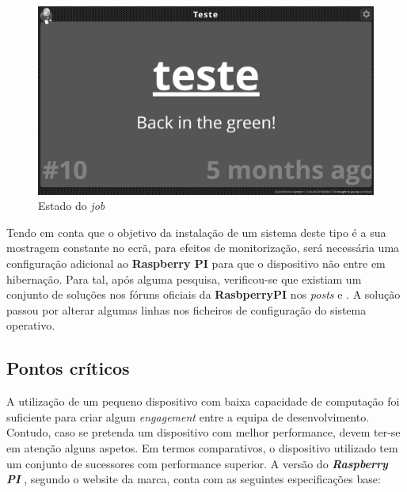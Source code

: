 \begin{figure}
\centering
\includegraphics[width=0.9\linewidth]{Cap8/BuildMonitorView.png}
\caption{Estado do \textit{job}}
\label{Fig:Fig6}
\end{figure}

\hspace{1cm}Tendo em conta que o objetivo da instalação de um sistema deste tipo é a sua mostragem constante no ecrã, para efeitos de monitorização, será necessária uma configuração adicional ao \textbf{Raspberry PI} para que o dispositivo não entre em hibernação. Para tal, após alguma pesquisa, verificou-se que existiam um conjunto de soluções nos fóruns oficiais da \textbf{RasbperryPI} nos \textit{posts} \textit{\cite{rasbperryPIFix}} e \textit{\cite{rasbperryPIFix2}}. A solução passou por alterar algumas linhas nos ficheiros de configuração do sistema operativo.

\subsection{Pontos críticos}

\hspace{1cm}A utilização de um pequeno dispositivo com baixa capacidade de computação foi suficiente para criar algum \textit{engagement} entre a equipa de desenvolvimento. Contudo, caso se pretenda um dispositivo com melhor performance, devem ter-se em atenção alguns aspetos. Em termos comparativos, o dispositivo utilizado tem um conjunto de sucessores com performance superior. A versão do \textbf{\textit{Raspberry PI}} \cite{rasbperryPIModel3}, segundo o website da marca, conta com as seguintes especificações base:

